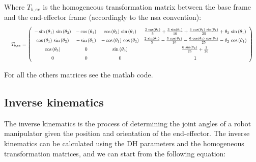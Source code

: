 \documentclass{article}
\begin{document}
Where $T_{b,ee}$ is the homogeneous transformation matrix between the base frame and the end-effector frame (accordingly to the nsa convention):
\begin{equation}
    \renewcommand{\arraystretch}{1.5} %
    \resizebox{\textwidth}{!}{
        $T_{b,ee} = \left(\begin{array}{cccc}
                    -\sin\left(\theta _{1}\right)\,\sin\left(\theta _{3}\right) & -\cos\left(\theta _{1}\right) & \cos\left(\theta _{3}\right)\,\sin\left(\theta _{1}\right)  & \frac{2\,\cos\left(\theta _{1}\right)}{5}+\frac{3\,\sin\left(\theta _{1}\right)}{10}+\frac{6\,\cos\left(\theta _{3}\right)\,\sin\left(\theta _{1}\right)}{25}+\theta _{2}\,\sin\left(\theta _{1}\right) \\
                    \cos\left(\theta _{1}\right)\,\sin\left(\theta _{3}\right)  & -\sin\left(\theta _{1}\right) & -\cos\left(\theta _{1}\right)\,\cos\left(\theta _{3}\right) & \frac{2\,\sin\left(\theta _{1}\right)}{5}-\frac{3\,\cos\left(\theta _{1}\right)}{10}-\frac{6\,\cos\left(\theta _{1}\right)\,\cos\left(\theta _{3}\right)}{25}-\theta _{2}\,\cos\left(\theta _{1}\right) \\
                    \cos\left(\theta _{3}\right)                                & 0                             & \sin\left(\theta _{3}\right)                                & \frac{6\,\sin\left(\theta _{3}\right)}{25}+\frac{3}{20}                                                                                                                                                 \\
                    0                                                           & 0                             & 0                                                           & 1
                \end{array}\right)$
    }
\end{equation}


For all the others matrices see the matlab code.






\subsection{Inverse kinematics}
\justify
The inverse kinematics is the process of determining the joint angles of a robot manipulator given the position and orientation of the end-effector.
The inverse kinematics can be calculated using the DH parameters and the homogeneous transformation matrices, and we can start from the following equation:
\end{document}
